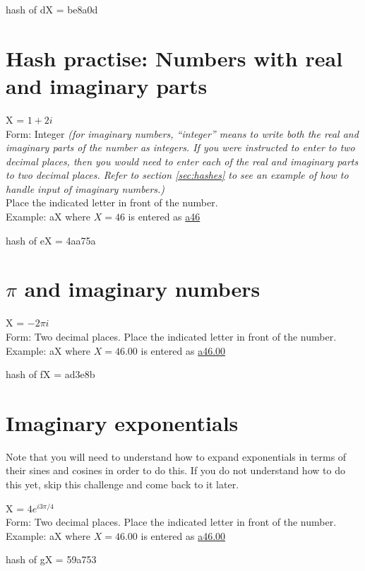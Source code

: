 hash of dX = be8a0d

\section{Hash practise: Numbers with real and imaginary parts}

X = $1+2i$\\
Form: Integer \emph{(for imaginary numbers, ``integer'' means to write both the real and imaginary parts of the number as integers. If you were instructed to enter to two decimal places, then you would need to enter each of the real and imaginary parts to two decimal places. Refer to section \ref{sec:hashes} to see an example of how to handle input of imaginary numbers.)}\\
Place the indicated letter in front of the number.\\
Example: aX where $X=46$ is entered as \href{http://www.wolframalpha.com/input/?i=md5+hash+of+\%22a46\%22}{a46}

hash of eX = 4aa75a

\section{$\pi$ and imaginary numbers}

X = $-2\pi i$\\
Form: Two decimal places.
Place the indicated letter in front of the number.\\
Example: aX where $X=46.00$ is entered as \href{http://www.wolframalpha.com/input/?i=md5+hash+of+\%22a46\%22}{a46.00}

hash of fX = ad3e8b

\section{Imaginary exponentials}

Note that you will need to understand how to expand exponentials in terms of their sines and cosines in order to do this. If you do not understand how to do this yet, skip this challenge and come back to it later.

X = $4e^{i 3 \pi/4}$\\
Form: Two decimal places.
Place the indicated letter in front of the number.\\
Example: aX where $X=46.00$ is entered as \href{http://www.wolframalpha.com/input/?i=md5+hash+of+\%22a46\%22}{a46.00}

hash of gX = 59a753
